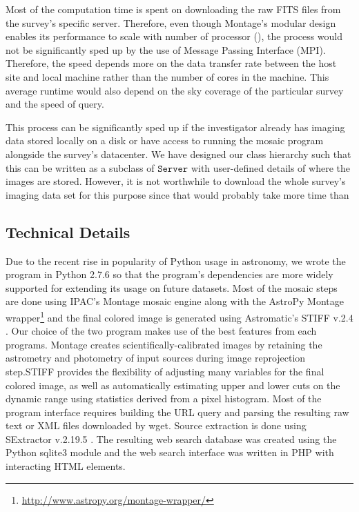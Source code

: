 \documentclass[authoryear, 12pt,5p, times]{elsarticle}
\begin{document}
Most of the computation time is spent on downloading the raw FITS files from the survey's specific server. Therefore, even though Montage's modular design enables its performance to scale with number of processor  (\citealp{montage}), the process would not be significantly sped up by the use of Message Passing Interface (MPI). Therefore, the speed depends more on the data transfer rate between the host site and local machine rather than the number of cores in the machine. This average runtime would also depend on the sky coverage of the  particular survey and the speed of query.

This process can  be significantly sped up if the investigator already has imaging data stored locally on a disk or have access to running the mosaic program alongside the survey's datacenter. We have designed our class hierarchy such that this can be written as a subclass of $\texttt{Server}$ with user-defined details of where the images are stored. However, it is not worthwhile to download the whole survey's imaging data set for this purpose since that would probably take more time than 

\subsection{Technical Details}

Due to the recent rise in popularity of Python usage in astronomy, we wrote the program in Python 2.7.6 so that the program's dependencies are more widely supported for extending its usage on future datasets. Most of the mosaic steps are done using IPAC's Montage  \citealp{montage} mosaic engine along with the AstroPy Montage wrapper\footnote{\url{http://www.astropy.org/montage-wrapper/}} and the final colored image is generated using Astromatic's STIFF v.2.4 \citealp{stiff}. Our choice of the two program makes use of the best features from each programs. Montage creates scientifically-calibrated images by retaining the astrometry and photometry of input sources during image reprojection step.STIFF provides the flexibility of adjusting many variables for the final colored image, as well as automatically estimating upper and lower cuts on the dynamic range using statistics derived from a pixel histogram. Most of the program interface requires building the URL query and parsing the resulting raw text or XML files downloaded by wget. Source extraction is done using SExtractor v.2.19.5 \citealp{sextractor}. The resulting web search database was created using the Python sqlite3 module and the web search interface was written in PHP with interacting HTML elements.
\end{document}
